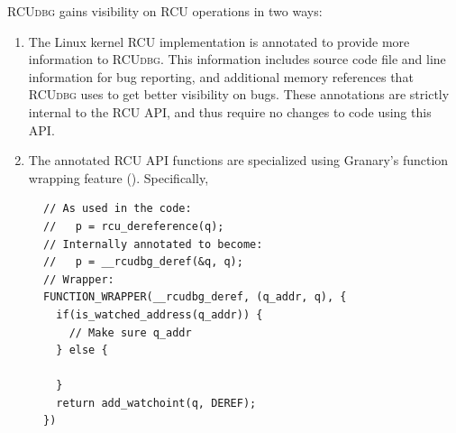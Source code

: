 \documentclass[preprint]{sigplanconf}
\newcommand{\toolname}[1]{{\scshape #1}}
\begin{document}


\toolname{RCUdbg} gains visibility on RCU operations in two ways: \begin{enumerate}
	\item The Linux kernel RCU implementation is annotated to provide more information to \toolname{RCUdbg}. This information includes source code file and line information for bug reporting, and additional memory references that \toolname{RCUdbg} uses to get better visibility on bugs. These annotations are strictly internal to the RCU API, and thus require no changes to code using this API.
	\item The annotated RCU API functions are specialized using Granary's function wrapping feature (). Specifically, 
\end{enumerate}





\begin{figure}[t!]
\lstset{language=C, tabsize=2, stepnumber=1}
\begin{lstlisting}[basicstyle=\scriptsize\ttfamily]
// As used in the code:
//   p = rcu_dereference(q);
// Internally annotated to become:
//   p = __rcudbg_deref(&q, q);
// Wrapper:
FUNCTION_WRAPPER(__rcudbg_deref, (q_addr, q), {
  if(is_watched_address(q_addr)) {
    // Make sure q_addr
  } else {

  }
  return add_watchoint(q, DEREF);
})
\end{lstlisting}
\caption{}
\label{fig:rcu_dereference_wrapper}
\end{figure}
\end{document}
